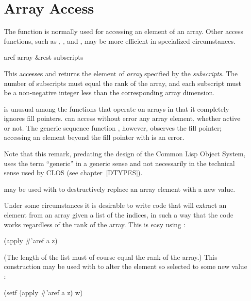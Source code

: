 \section{Array Access}

The function  is normally
used for accessing an element of an array.
Other access functions, such as , , and ,
may be more efficient in specialized circumstances.

\begin{defun}[Function]
aref array &rest subscripts

This accesses and returns the element of {\it array} specified
by the {\it subscripts}.  The number of subscripts must
equal the rank of the array, and each subscript must be
a non-negative integer less than the corresponding array dimension.

 is unusual among the functions that operate on arrays
in that it completely ignores fill pointers.   can access
without error any array element, whether active or not.  The generic
sequence function , however, observes the fill pointer;
accessing an element beyond the fill pointer with  is an error.

\begin{new}
Note that this remark, predating the design of the Common Lisp Object System,
uses the term ``generic'' in a generic sense and not necessarily
in the technical sense used by CLOS
(see chapter~\ref{DTYPES}).
\end{new}

 may be used with  to destructively replace
an array element with a new value.

Under some circumstances it is desirable to write code that
will extract an element from an array  given a list  of the indices,
in such a way that the code works regardless of the rank of the
array.  This is easy using :
\begin{lisp}
(apply \#'aref a z)
\end{lisp}
(The length of the list must of course equal the rank of
the array.)  This construction may be used with  to alter
the element so selected to some new value :
\begin{lisp}
(setf (apply \#'aref a z) w)
\end{lisp}
\end{defun}

